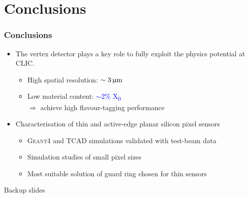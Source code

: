 \section{Conclusions}
\begin{frame}
  \frametitle{}
  \tableofcontents[currentsection]
\end{frame}
\label{lastslide}
\begin{frame}
  \frametitle{Conclusions}

  \begin{itemize}
  \item The vertex detector plays a key role to fully exploit the
    physics potential at CLIC.
    \begin{itemize}
    \item High spatial resolution: \textcolor{Blue}{$\sim3\,\upmu\mathrm{m}$}
    \item Low material content: \textcolor{Blue}{$\sim$2\%
        X\textsubscript{0}} \\
      $\Rightarrow$ achieve high flavour-tagging performance
    \end{itemize} 
    \item Characterisation of thin and active-edge planar silicon
      pixel sensors
      \begin{itemize}
      \item \textsc{Geant4} and TCAD simulations validated with
        test-beam data
      \item Simulation studies of small pixel sizes
      \item Most suitable solution of guard ring chosen for thin
        sensors
      \end{itemize}

  \end{itemize}

\end{frame}

\begin{frame}

  \centering
  \Huge{Backup slides}

\end{frame}

